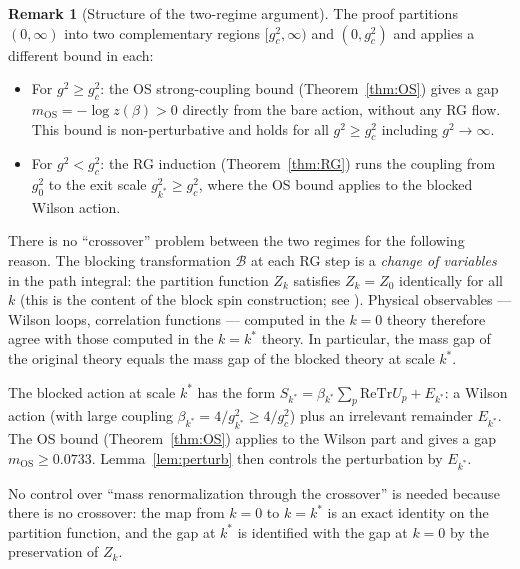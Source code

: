 \documentclass[11pt,a4paper]{amsart}
\theoremstyle{definition}
\newtheorem{remark}[theorem]{Remark}
\newcommand{\re}{\mathrm{Re}}
\newcommand{\Tr}{\mathrm{Tr}}
\begin{document}
\begin{remark}[Structure of the two-regime argument]
\label{rem:two_regime}
The proof partitions $(0,\infty)$ into two complementary regions
$[g^2_c, \infty)$ and $(0, g^2_c)$ and applies a different bound in each:
\begin{itemize}
\item For $g^2 \ge g^2_c$: the OS strong-coupling bound (Theorem~\ref{thm:OS})
      gives a gap $m_{\mathrm{OS}} = -\log z(\beta) > 0$ directly from the bare
      action, without any RG flow.  This bound is non-perturbative and holds
      for all $g^2 \ge g^2_c$ including $g^2 \to \infty$.
\item For $g^2 < g^2_c$: the RG induction (Theorem~\ref{thm:RG}) runs the
      coupling from $g^2_0$ to the exit scale $g^2_{k^*} \ge g^2_c$, where the
      OS bound applies to the blocked Wilson action.
\end{itemize}
There is no ``crossover'' problem between the two regimes for the following reason.
The blocking transformation $\mathcal{B}$ at each RG step is a \emph{change of
variables} in the path integral: the partition function $Z_k$ satisfies
$Z_k = Z_0$ identically for all $k$ (this is the content of the block spin
construction; see \cite{B87,D11}).  Physical observables — Wilson loops,
correlation functions — computed in the $k=0$ theory therefore agree with
those computed in the $k=k^*$ theory.  In particular, the mass gap of the
original theory equals the mass gap of the blocked theory at scale $k^*$.

The blocked action at scale $k^*$ has the form $S_{k^*} = \beta_{k^*}\sum_p\re\Tr U_p + E_{k^*}$:
a Wilson action (with large coupling $\beta_{k^*} = 4/g^2_{k^*} \ge 4/g^2_c$)
plus an irrelevant remainder $E_{k^*}$.  The OS bound
(Theorem~\ref{thm:OS}) applies to the Wilson part and gives a gap $m_{\mathrm{OS}} \ge 0.0733$.
Lemma~\ref{lem:perturb} then controls the perturbation by $E_{k^*}$.

No control over ``mass renormalization through the crossover'' is needed because
there is no crossover: the map from $k=0$ to $k=k^*$ is an exact identity on
the partition function, and the gap at $k^*$ is identified with the gap at $k=0$
by the preservation of $Z_k$.
\end{remark}
\end{document}
